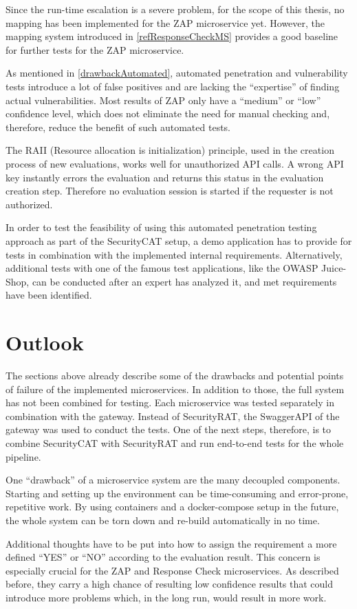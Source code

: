 Since the run-time escalation is a severe problem, for the scope of this thesis, no mapping has been implemented for the ZAP microservice yet. However, the mapping system introduced in \ref{refResponseCheckMS} provides a good baseline for further tests for the ZAP microservice.

As mentioned in \ref{drawbackAutomated}, automated penetration and vulnerability tests introduce a lot of false positives and are lacking the \enquote{expertise} of finding actual vulnerabilities.
Most results of ZAP only have a \enquote{medium} or \enquote{low} confidence level, which does not eliminate the need for manual checking and, therefore, reduce the benefit of such automated tests. 

The RAII (Resource allocation is initialization) principle, used in the creation process of new evaluations, works well for unauthorized API calls. A wrong API key instantly errors the evaluation and returns this status in the evaluation creation step. Therefore no evaluation session is started if the requester is not authorized.

In order to test the feasibility of using this automated penetration testing approach as part of the SecurityCAT setup, a demo application has to provide for tests in combination with the implemented internal requirements. Alternatively, additional tests with one of the famous test applications, like the OWASP Juice-Shop, can be conducted after an expert has analyzed it, and met requirements have been identified.


\section{Outlook}
The sections above already describe some of the drawbacks and potential points of failure of the implemented microservices. In addition to those, the full system has not been combined for testing. Each microservice was tested separately in combination with the gateway. Instead of SecurityRAT, the SwaggerAPI of the gateway was used to conduct the tests.
One of the next steps, therefore, is to combine SecurityCAT with SecurityRAT and run end-to-end tests for the whole pipeline.

One \enquote{drawback} of a microservice system are the many decoupled components. Starting and setting up the environment can be time-consuming and error-prone, repetitive work. By using containers and a docker-compose setup in the future, the whole system can be torn down and re-build automatically in no time.  

Additional thoughts have to be put into how to assign the requirement a more defined \enquote{YES} or \enquote{NO} according to the evaluation result. This concern is especially crucial for the ZAP and Response Check microservices. As described before, they carry a high chance of resulting low confidence results that could introduce more problems which, in the long run, would result in more work.